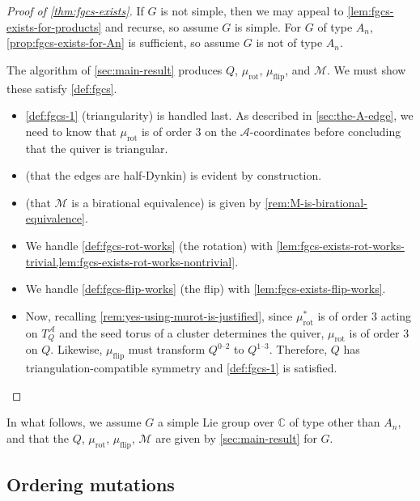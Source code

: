 \documentclass{amsart}
\theoremstyle{plain}
\theoremstyle{definition}
\theoremstyle{remark}
\newcommand{\Qdv}{Q^{0\text{--}2}}
\newcommand{\Qdh}{Q^{1\text{--}3}}
\newcommand{\conftoquiv}{\mathcal{M}}
\newcommand{\murotind}{{\mu_{\text{rot}}^{\ast}}}
\newcommand{\seedAtorus}{T^{\mathcal{A}}}
\newcommand{\muflip}{{\mu_{\text{flip}}}}
\newcommand{\murot}{{\mu_{\text{rot}}}}
\begin{document}
  \begin{proof}[Proof of \cref{thm:fgcs-exists}]
    If $G$ is not simple, then we may appeal to
    \cref{lem:fgcs-exists-for-products} and recurse, so assume $G$ is
    simple. For $G$ of type $A_n$, \cref{prop:fgcs-exists-for-An} is
    sufficient, so assume $G$ is not of type $A_n$.

    The algorithm of \cref{sec:main-result} produces $Q$, $\murot$,
    $\muflip$, and $\conftoquiv$. We must show these satisfy
    \cref{def:fgcs}.

    \begin{itemize}
    \item
      \cref{def:fgcs-1} (triangularity) is handled last. As described in
      \cref{sec:the-A-edge}, we need to know that $\murot$ is of order
      $3$ on the $\mathcal{A}$-coordinates before concluding that the
      quiver is triangular.
    \item
       (that the edges are half-Dynkin) is evident by
      construction.
    \item
       (that $\conftoquiv$ is
      a birational equivalence) is given by
      \cref{rem:M-is-birational-equivalence}.
    \item
      We handle \cref{def:fgcs-rot-works} (the rotation) with \cref{lem:fgcs-exists-rot-works-trivial,lem:fgcs-exists-rot-works-nontrivial}.
    \item
      We handle \cref{def:fgcs-flip-works} (the flip) with
      \cref{lem:fgcs-exists-flip-works}.
    \item
      Now, recalling \cref{rem:yes-using-murot-is-justified}, since
      $\murotind$ is of order $3$ acting on $\seedAtorus_Q$ and the seed
      torus of a cluster determines the quiver, $\murot$ is of order $3$
      on $Q$. Likewise, $\muflip$ must transform $\Qdv$ to $\Qdh$.
      Therefore, $Q$ has triangulation-compatible symmetry and
      \cref{def:fgcs-1} is satisfied.
    \end{itemize}
  \end{proof}

  In what follows, we assume $G$ a simple Lie group over $\mathbb{C}$ of
  type other than $A_n$, and that the $Q$, $\murot$, $\muflip$,
  $\conftoquiv$ are given by \cref{sec:main-result} for $G$.

  \subsection{Ordering mutations}
\end{document}
